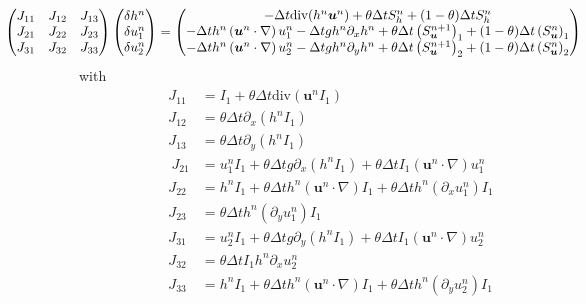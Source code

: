 \documentclass[a4paper, 11pt]{article}
\begin{document}
\begin{equation*}
\begin{split}
\hspace*{-2cm}\begin{pmatrix}
J_{11} & J_{12} & J_{13} \\
J_{21}& J_{22}& J_{23}\\
J_{31}& J_{32}& J_{33}
\end{pmatrix}\begin{pmatrix}
\delta h^n\\\delta u_1^n\\\delta u_2^n\end{pmatrix}
=\begin{pmatrix}-\Delta t\text{div}(h^n\boldsymbol{u}^n)+\theta \Delta tS_h^n+(1-\theta)\Delta tS_h^{n}\\-\Delta th^n\left(\boldsymbol{u}^n\cdot\nabla\right)u_1^n-\Delta tgh^n\partial_xh^n+\theta \Delta t\left(S_{\boldsymbol{u}}^{n+1}\right)_1+(1-\theta)\Delta t\left(S_{\boldsymbol{u}}^n\right)_1\\-\Delta th^n\left(\boldsymbol{u}^n\cdot\nabla\right)u_2^n-\Delta tgh^n\partial_y h^n+\theta \Delta t\left(S_{\boldsymbol{u}}^{n+1}\right)_2+(1-\theta)\Delta t\left(S_{\boldsymbol{u}}^n\right)_2\end{pmatrix}
\end{split}
\end{equation*}
with
\begin{align*}
J_{11} &=  I_1+\theta\Delta t\text{div}\left(\boldsymbol{u}^nI_1\right)\\
J_{12} & = \theta\Delta t\partial_x\left(h^nI_1\right)\\
J_{13} & =\theta\Delta t\partial_y\left(h^nI_1\right)\\\
J_{21} &= u^n_1I_1+\theta\Delta t g\partial_x\left(h^nI_1\right)+\theta\Delta tI_1\left(\boldsymbol{u}^n\cdot\nabla\right)u_1^n\\
J_{22} &= h^nI_1+\theta\Delta th^n\left(\boldsymbol{u}^n\cdot \nabla\right)I_1+\theta\Delta th^n(\partial_xu_1^n)I_1\\
J_{23} &= \theta\Delta th^n(\partial_yu_1^n)I_1\\
J_{31} &= u_2^nI_1+\theta\Delta tg\partial_y\left(h^nI_1\right)+\theta\Delta tI_1\left(\boldsymbol{u}^n\cdot\nabla\right)u_2^n\\
J_{32} &= \theta\Delta tI_1h^n\partial_xu_2^n \\
J_{33} &= h^nI_1+\theta\Delta th^n\left(\boldsymbol{u}^n\cdot\nabla\right)I_1+\theta\Delta th^n(\partial_yu_2^n)I_1
\end{align*}
\end{document}
